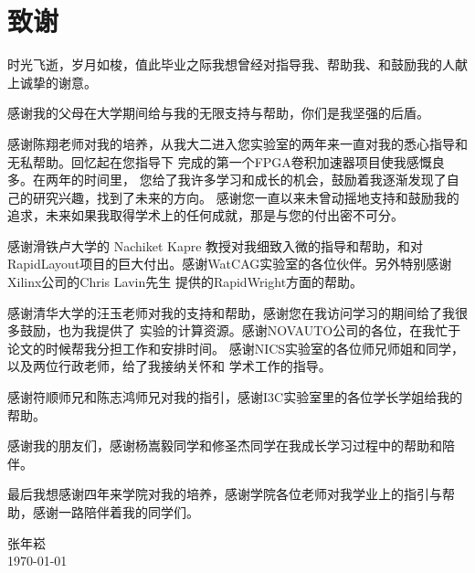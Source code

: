 \chapter{致谢}





时光飞逝，岁月如梭，值此毕业之际我想曾经对指导我、帮助我、和鼓励我的人献上诚挚的谢意。

感谢我的父母在大学期间给与我的无限支持与帮助，你们是我坚强的后盾。

感谢陈翔老师对我的培养，从我大二进入您实验室的两年来一直对我的悉心指导和无私帮助。回忆起在您指导下
完成的第一个FPGA卷积加速器项目使我感慨良多。在两年的时间里，
您给了我许多学习和成长的机会，鼓励着我逐渐发现了自己的研究兴趣，找到了未来的方向。
感谢您一直以来未曾动摇地支持和鼓励我的追求，未来如果我取得学术上的任何成就，那是与您的付出密不可分。

感谢滑铁卢大学的 Nachiket Kapre 教授对我细致入微的指导和帮助，和对
RapidLayout项目的巨大付出。感谢WatCAG实验室的各位伙伴。另外特别感谢Xilinx公司的Chris Lavin先生
提供的RapidWright方面的帮助。

感谢清华大学的汪玉老师对我的支持和帮助，感谢您在我访问学习的期间给了我很多鼓励，也为我提供了
实验的计算资源。感谢NOVAUTO公司的各位，在我忙于论文的时候帮我分担工作和安排时间。
感谢NICS实验室的各位师兄师姐和同学，以及两位行政老师，给了我接纳关怀和
学术工作的指导。


感谢符顺师兄和陈志鸿师兄对我的指引，感谢I3C实验室里的各位学长学姐给我的帮助。

感谢我的朋友们，感谢杨嵩毅同学和修圣杰同学在我成长学习过程中的帮助和陪伴。

最后我想感谢四年来学院对我的培养，感谢学院各位老师对我学业上的指引与帮助，感谢一路陪伴着我的同学们。








\vskip 108pt
\begin{flushright}
	张年崧\makebox[1cm]{} \\
	\today
\end{flushright}

